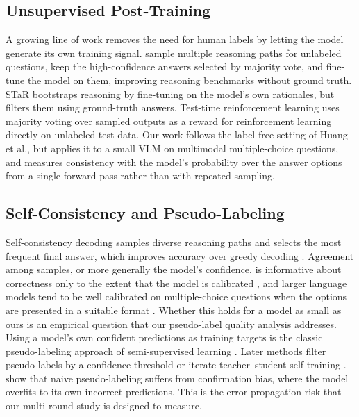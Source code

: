 \documentclass{article}
\begin{document}
\subsection{Unsupervised Post-Training}
A growing line of work removes the need for human labels by letting the model generate its own training signal. \citet{huang2023selfimprove} sample multiple reasoning paths for unlabeled questions, keep the high-confidence answers selected by majority vote, and fine-tune the model on them, improving reasoning benchmarks without ground truth. STaR \citep{zelikman2022star} bootstraps reasoning by fine-tuning on the model's own rationales, but filters them using ground-truth answers. Test-time reinforcement learning \citep{zuo2025ttrl} uses majority voting over sampled outputs as a reward for reinforcement learning directly on unlabeled test data. Our work follows the label-free setting of Huang et al., but applies it to a small VLM on multimodal multiple-choice questions, and measures consistency with the model's probability over the answer options from a single forward pass rather than with repeated sampling.

\subsection{Self-Consistency and Pseudo-Labeling}
Self-consistency decoding samples diverse reasoning paths and selects the most frequent final answer, which improves accuracy over greedy decoding \citep{wang2023selfconsistency}. Agreement among samples, or more generally the model's confidence, is informative about correctness only to the extent that the model is calibrated \citep{guo2017calibration}, and larger language models tend to be well calibrated on multiple-choice questions when the options are presented in a suitable format \citep{kadavath2022know}. Whether this holds for a model as small as ours is an empirical question that our pseudo-label quality analysis addresses. Using a model's own confident predictions as training targets is the classic pseudo-labeling approach of semi-supervised learning \citep{lee2013pseudo}. Later methods filter pseudo-labels by a confidence threshold \citep{sohn2020fixmatch} or iterate teacher--student self-training \citep{xie2020noisystudent}. \citet{arazo2020confirmation} show that naive pseudo-labeling suffers from confirmation bias, where the model overfits to its own incorrect predictions. This is the error-propagation risk that our multi-round study is designed to measure.
\end{document}
